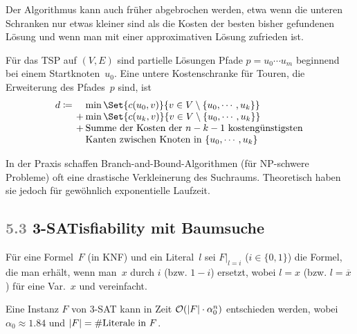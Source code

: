 \documentclass{cheat-sheet}
\renewcommand{\O}{\mathcal{O}} %
\newcommand{\Problem}[1]{\textcolor{ProblemColor}{\textbf{#1}}}
\newcommand{\scriptSection}[1]{\textcolor{gray}{#1}\enspace}
\begin{document}
\begin{bem}
  Der Algorithmus kann auch früher abgebrochen werden, etwa wenn die unteren Schranken nur etwas kleiner sind als die Kosten der besten bisher gefundenen Lösung und wenn man mit einer approximativen Lösung zufrieden ist.
\end{bem}

\begin{bsp}
  Für das TSP auf $(V, E)$ sind partielle Lösungen Pfade $p = u_0 \cdots u_m$ beginnend bei einem Startknoten~$u_0$.
  Eine untere Kostenschranke für Touren, die Erweiterung des Pfades~$p$ sind, ist
  \[
    \arraycolsep=1pt
    d \coloneqq
    \begin{array}[t]{r l}
      & \min \Set{c(u_0, v)}{v \in V \setminus \{ u_0, \cdots, u_k \}} \\
      +& \min \Set{c(u_k, v)}{v \in V \setminus \{ u_0, \cdots, u_k \}} \\
      +& \text{Summe der Kosten der $n-k-1$ kostengünstigsten} \\
      & \text{Kanten zwischen Knoten in } \{ u_0, \cdots, u_k \}
    \end{array}
  \]
\end{bsp}

\begin{bem}
  In der Praxis schaffen Branch-and-Bound-Algorithmen (für NP-schwere Probleme) oft eine drastische Verkleinerung des Suchraums.
  Theoretisch haben sie jedoch für gewöhnlich exponentielle Laufzeit.
\end{bem}

\subsection{\scriptSection{5.3} \Problem{3-SATisfiability} mit Baumsuche}

\begin{nota}
  Für eine Formel~$F$ (in KNF) und ein Literal~$l$ sei $F|_{l=i}$ ($i \!\in\! \{0,1\}$) die Formel, die man erhält, wenn man~$x$ durch $i$ (bzw. $1 \!-\! i$) ersetzt, wobei $l \!=\! x$ (bzw. $l \!=\! \overline{x}$) für eine Var.~$x$ und vereinfacht.
\end{nota}

\begin{satz}
  Eine Instanz $F$ von 3-SAT kann in Zeit $\O(\abs{F} \cdot \alpha_0^n)$ entschieden werden, wobei $\alpha_0 \approx 1.84$ und $\lvert F\rvert = \#\text{Literale in~$F$}$.
\end{satz}
\end{document}
